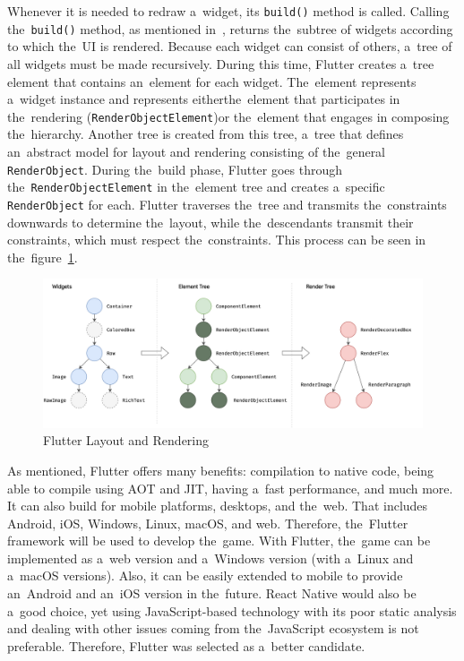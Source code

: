 Whenever it is needed to redraw a~widget, its \texttt{build()} method is called.
Calling the~\texttt{build()} method, as mentioned in~\cite{a2022_flutter_architecture}, returns the~subtree of widgets according to which the~UI is rendered.
Because each widget can consist of others, a~tree of all widgets must be made recursively.
During this time, Flutter creates a~tree element that contains an~element for each widget.
\linebreak
The~element represents a~widget instance and represents either\linebreak{}the~element that participates in the~rendering (\texttt{RenderObjectElement})\linebreak{}or the~element that engages in composing the~hierarchy.
Another tree is created from this tree, a~tree that defines an~abstract model for layout and rendering consisting of the~general \texttt{RenderObject}.
During the~build phase, Flutter goes through the~\texttt{RenderObjectElement} in the~element tree and creates a~specific \texttt{RenderObject} for each.
Flutter traverses the~tree and transmits the~constraints downwards to determine the~layout, while the~descendants transmit their constraints, which must respect the~constraints.
This process can be seen in the~figure~\ref{fig:design:fluttertrees}.

\begin{figure}
    \centering
    \includegraphics[width=1\linewidth]{assets/design/fluttertrees.png}
    \caption{Flutter Layout and Rendering~\cite{a2022_flutter_architecture}}
    \label{fig:design:fluttertrees}
\end{figure}

As mentioned, Flutter offers many benefits: compilation to native code, being able to compile using AOT and JIT, having a~fast performance, and much more.
It can also build for mobile platforms, desktops, and the~web.
That includes Android, iOS, Windows, Linux, macOS, and web.
Therefore, the~Flutter framework will be used to develop the~game.
With Flutter, the~game can be implemented as a~web version and a~Windows version (with a~Linux and a~macOS versions).
Also, it can be easily extended to mobile to provide an~Android and an~iOS version in the~future.
React Native would also be a~good choice, yet using JavaScript-based technology with its poor static analysis and dealing with other issues coming from the~JavaScript ecosystem is not preferable.
Therefore, Flutter was selected as a~better candidate.

